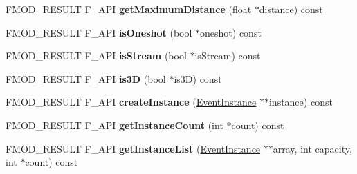 \begin{DoxyCompactItemize}
\item 
\hypertarget{class_f_m_o_d_1_1_studio_1_1_event_description_adacd85a12ce9bcf3d347b6364c5c50a7}{F\+M\+O\+D\+\_\+\+R\+E\+S\+U\+L\+T F\+\_\+\+A\+P\+I {\bfseries get\+Maximum\+Distance} (float $\ast$distance) const }\label{class_f_m_o_d_1_1_studio_1_1_event_description_adacd85a12ce9bcf3d347b6364c5c50a7}

\item 
\hypertarget{class_f_m_o_d_1_1_studio_1_1_event_description_abeeb0cf6e03275f312e06727f21d9418}{F\+M\+O\+D\+\_\+\+R\+E\+S\+U\+L\+T F\+\_\+\+A\+P\+I {\bfseries is\+Oneshot} (bool $\ast$oneshot) const }\label{class_f_m_o_d_1_1_studio_1_1_event_description_abeeb0cf6e03275f312e06727f21d9418}

\item 
\hypertarget{class_f_m_o_d_1_1_studio_1_1_event_description_a378c20afe76e86acce4b909b9fe5f212}{F\+M\+O\+D\+\_\+\+R\+E\+S\+U\+L\+T F\+\_\+\+A\+P\+I {\bfseries is\+Stream} (bool $\ast$is\+Stream) const }\label{class_f_m_o_d_1_1_studio_1_1_event_description_a378c20afe76e86acce4b909b9fe5f212}

\item 
\hypertarget{class_f_m_o_d_1_1_studio_1_1_event_description_aba1144b5eabd516e058b9e292948e573}{F\+M\+O\+D\+\_\+\+R\+E\+S\+U\+L\+T F\+\_\+\+A\+P\+I {\bfseries is3\+D} (bool $\ast$is3\+D) const }\label{class_f_m_o_d_1_1_studio_1_1_event_description_aba1144b5eabd516e058b9e292948e573}

\item 
\hypertarget{class_f_m_o_d_1_1_studio_1_1_event_description_aef7bcf9f0cac78493484ab7766a72b4f}{F\+M\+O\+D\+\_\+\+R\+E\+S\+U\+L\+T F\+\_\+\+A\+P\+I {\bfseries create\+Instance} (\hyperlink{class_f_m_o_d_1_1_studio_1_1_event_instance}{Event\+Instance} $\ast$$\ast$instance) const }\label{class_f_m_o_d_1_1_studio_1_1_event_description_aef7bcf9f0cac78493484ab7766a72b4f}

\item 
\hypertarget{class_f_m_o_d_1_1_studio_1_1_event_description_aae0cb88ac565314f4a2e5d7a0d0c1f4b}{F\+M\+O\+D\+\_\+\+R\+E\+S\+U\+L\+T F\+\_\+\+A\+P\+I {\bfseries get\+Instance\+Count} (int $\ast$count) const }\label{class_f_m_o_d_1_1_studio_1_1_event_description_aae0cb88ac565314f4a2e5d7a0d0c1f4b}

\item 
\hypertarget{class_f_m_o_d_1_1_studio_1_1_event_description_af9c6c1e885ad40974c77b9adcd656a42}{F\+M\+O\+D\+\_\+\+R\+E\+S\+U\+L\+T F\+\_\+\+A\+P\+I {\bfseries get\+Instance\+List} (\hyperlink{class_f_m_o_d_1_1_studio_1_1_event_instance}{Event\+Instance} $\ast$$\ast$array, int capacity, int $\ast$count) const }\label{class_f_m_o_d_1_1_studio_1_1_event_description_af9c6c1e885ad40974c77b9adcd656a42}


\end{DoxyCompactItemize}
